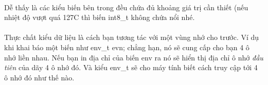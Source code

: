 \documentclass[12pt,a5paper]{book}
\begin{document}
\paragraph{}
Dễ thấy là các kiểu biến bên trong đều chứa đủ khoảng giá trị cần thiết (nếu nhiệt độ vượt quá 127\textdegree{}C thì biến int8\_t không chứa nổi nhé.
\paragraph{}
Thực chất kiểu dữ liệu là cách bạn tương tác với một vùng nhớ cho trước. Ví dụ khi khai báo một biến như env\_t evn; chẳng hạn, nó sẽ cung cấp cho bạn 4 ô nhớ liền nhau. Nếu bạn in địa chỉ của biến env ra nó sẽ hiển thị địa chỉ ô nhớ \textit{đầu tiên} của dãy 4 ô nhớ đó. Và kiểu env\_t sẽ cho máy tính biết cách truy cập tới 4 ô nhớ đó như thế nào.%
\end{document}
